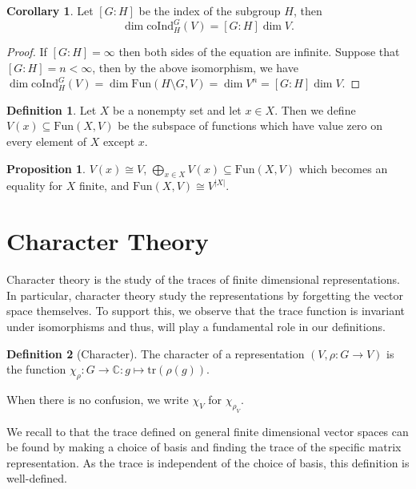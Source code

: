 \documentclass[]{article}
\theoremstyle{definition}
\newtheorem{corollary}{Corollary}[theorem]
\theoremstyle{definition}
\newtheorem{definition}{Definition}[section]
\newtheorem{proposition}{Proposition}[section]
\begin{document}
\begin{corollary}
  Let \([G : H]\) be the index of the subgroup \(H\), then 
  \[\dim \text{coInd}_H^G(V) = [G : H]\dim V.\]
\end{corollary}
\begin{proof}
  If \([G : H] = \infty\) then both sides of the equation are infinite. 
  Suppose that \([G : H] = n < \infty\), then by the above isomorphism, 
  we have \(\dim \text{coInd}_H^G(V) = \dim \text{Fun}(H \setminus G, V) = 
  \dim V^n = [G : H] \dim V\).
\end{proof}

\begin{definition}
  Let \(X\) be a nonempty set and let \(x \in X\). Then we define 
  \(V(x) \subseteq \text{Fun}(X, V)\) be the subspace of functions which have 
  value zero on every element of \(X\) except \(x\). 
\end{definition}

\begin{proposition}
  \(V(x) \cong V\), \(\bigoplus_{x \in X} V(x) \subseteq \text{Fun}(X, V)\) which 
  becomes an equality for \(X\) finite, and \(\text{Fun}(X, V) \cong V^{|X|}\).
\end{proposition}

\newpage 
\section{Character Theory}

Character theory is the study of the traces of finite dimensional representations.
In particular, character theory study the representations by forgetting the 
vector space themselves. To support this, we observe that the trace function 
is invariant under isomorphisms and thus, will play a fundamental role 
in our definitions. 

\begin{definition}[Character]
  The character of a representation \((V, \rho : G \to V)\) is 
  the function \(\chi_\rho : G \to \mathbb{C} : g \mapsto \text{tr}(\rho(g))\). 

  When there is no confusion, we write \(\chi_V\) for \(\chi_{\rho_V}\).
\end{definition}

We recall to that the trace defined on general finite dimensional vector spaces 
can be found by making a choice of basis and finding the trace of the specific 
matrix representation. As the trace is independent of the choice of basis, 
this definition is well-defined. 
\end{document}
